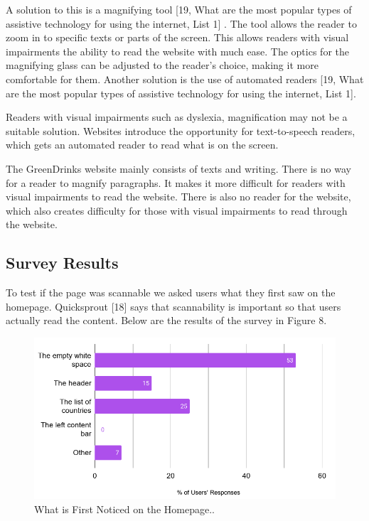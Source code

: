 \documentclass[12pt]{article}
\begin{document}
A solution to this is a magnifying tool [19, What are the most popular types of assistive technology for using the internet, List 1] . The tool allows the reader to zoom in to specific texts or parts of the screen. This allows readers with visual impairments the ability to read the website with much ease. The optics for the magnifying glass can be adjusted to the reader’s choice, making it more comfortable for them. Another solution is the use of automated readers [19, What are the most popular types of assistive technology for using the internet, List 1]. 

Readers with visual impairments such as dyslexia, magnification may not be a suitable solution. Websites introduce the opportunity for text-to-speech readers, which gets an automated reader to read what is on the screen.

The GreenDrinks website mainly consists of texts and writing. There is no way for a reader to magnify paragraphs. It makes it more difficult for readers with visual impairments to read the website. There is also no reader for the website, which also creates difficulty for those with visual impairments to read through the website.



\subsection{Survey Results}
To test if the page was scannable we asked users what they first saw on the homepage. Quicksprout [18] says that scannability is important so that users actually read the content. Below are the results of the survey in Figure 8.
\begin{figure}[ht]
\centering
\includegraphics[width=1.0\textwidth]{f8}
\caption[What is First Noticed on the Homepage.]{What is First Noticed on the Homepage.\footnotemark.}
\end{figure}
\end{document}
